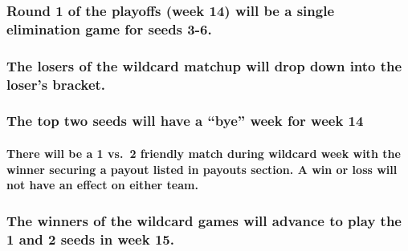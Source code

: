 \documentclass[
]{book}
\begin{document}
\hypertarget{round-1-of-the-playoffs-week-14-will-be-a-single-elimination-game-for-seeds-3-6.}{%
\subsubsection{Round 1 of the playoffs (week 14) will be a single elimination game for seeds 3-6.}\label{round-1-of-the-playoffs-week-14-will-be-a-single-elimination-game-for-seeds-3-6.}}

\hypertarget{the-losers-of-the-wildcard-matchup-will-drop-down-into-the-losers-bracket.}{%
\subsubsection{The losers of the wildcard matchup will drop down into the loser's bracket.}\label{the-losers-of-the-wildcard-matchup-will-drop-down-into-the-losers-bracket.}}

\hypertarget{the-top-two-seeds-will-have-a-bye-week-for-week-14}{%
\subsubsection{The top two seeds will have a ``bye'' week for week 14}\label{the-top-two-seeds-will-have-a-bye-week-for-week-14}}

\hypertarget{there-will-be-a-1-vs.-2-friendly-match-during-wildcard-week-with-the-winner-securing-a-payout-listed-in-payouts-section.-a-win-or-loss-will-not-have-an-effect-on-either-team.}{%
\paragraph{There will be a 1 vs.~2 friendly match during wildcard week with the winner securing a payout listed in payouts section. A win or loss will not have an effect on either team.}\label{there-will-be-a-1-vs.-2-friendly-match-during-wildcard-week-with-the-winner-securing-a-payout-listed-in-payouts-section.-a-win-or-loss-will-not-have-an-effect-on-either-team.}}

\hypertarget{the-winners-of-the-wildcard-games-will-advance-to-play-the-1-and-2-seeds-in-week-15.}{%
\subsubsection{The winners of the wildcard games will advance to play the 1 and 2 seeds in week 15.}\label{the-winners-of-the-wildcard-games-will-advance-to-play-the-1-and-2-seeds-in-week-15.}}
\end{document}
